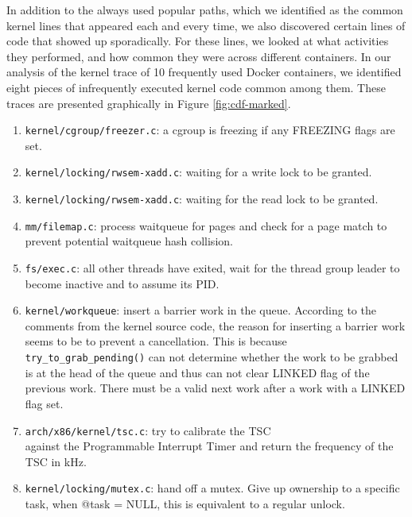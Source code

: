 In addition to the always used popular paths, which we identified as the common kernel lines that appeared each and every time, 
we also discovered certain lines of code that showed up sporadically. For these lines, we looked at what activities they performed, and how common they were across different containers. 
In our analysis of the kernel trace of 10 frequently used Docker containers, we identified eight pieces of infrequently executed kernel code common among them.  
These traces are presented graphically in Figure \ref{fig:cdf-marked}. 
\begin{enumerate}
	\item \verb|kernel/cgroup/freezer.c|: a cgroup is freezing if any FREEZING flags are set.
	\item \verb|kernel/locking/rwsem-xadd.c|: waiting for a write lock to be granted. 
	\item \verb|kernel/locking/rwsem-xadd.c|: waiting for the read lock to be granted.
	\item \verb|mm/filemap.c|: process waitqueue for pages and check for a page match to prevent potential waitqueue hash collision. 
	\item \verb|fs/exec.c|: all other threads have exited, wait for the thread group leader to become inactive and to assume its PID. 
	\item \verb|kernel/workqueue|: insert a barrier work in the queue. According to the comments from the kernel source code, 
	the reason for inserting a barrier work seems to be to prevent a cancellation. 
	This is because \\
	\verb|try_to_grab_pending()| can not determine whether the work to be grabbed is at the head of the queue and thus can not clear LINKED flag of the previous work. 
	There must be a valid next work after a work with a LINKED flag set. 
	\item \verb|arch/x86/kernel/tsc.c|: try to calibrate the TSC \\ 
	against the Programmable Interrupt Timer and return the frequency of the TSC in kHz. 
	\item \verb|kernel/locking/mutex.c|: hand off a mutex. Give up ownership to a specific task, when @task = NULL, this is equivalent to a regular unlock.
\end{enumerate}

